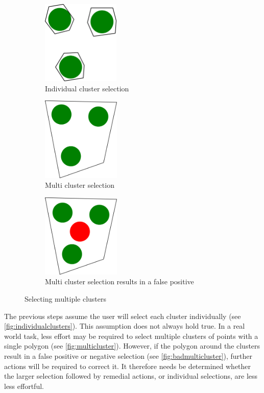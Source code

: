 \begin{figure}
\centering
\begin{subfigure}{.3\textwidth}
  \centering
  \includegraphics[height=4cm]{images/evaltool/individual.png}
  \caption{Individual cluster selection}
  \label{fig:individualclusters}
\end{subfigure}%
\begin{subfigure}{.3\textwidth}
  \centering
  \includegraphics[height=4cm]{images/evaltool/goodselect.png}
  \caption{Multi cluster selection}
  \label{fig:multicluster}
\end{subfigure}%
\begin{subfigure}{.3\textwidth}
  \centering
  \includegraphics[height=4cm]{images/evaltool/badselect.png}
  \caption{Multi cluster selection results in a false positive}
  \label{fig:badmulticluster}
\end{subfigure}
\caption{Selecting multiple clusters}\label{multiselect}
\label{fig:test}
\end{figure}



The previous steps assume the user will select each cluster individually (see \autoref{fig:individualclusters}). This assumption does not always hold true. In a real world task, less effort may be required to select multiple clusters of points with a single polygon (see \autoref{fig:multicluster}). However, if the polygon around the clusters result in a false positive or negative selection (see \autoref{fig:badmulticluster}), further actions will be required to correct it. It therefore needs be determined whether the larger selection followed by remedial actions, or individual selections, are less less effortful.

